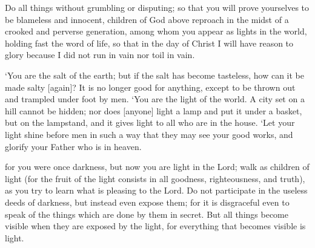 \begin{scripture}[Philippians 2:14-16]
    Do all things without grumbling or disputing;
    so that you will prove yourselves to be blameless and innocent, children of God above reproach in the midst of a crooked and perverse generation, among whom you appear as lights in the world,
    holding fast the word of life, so that in the day of Christ I will have reason to glory because I did not run in vain nor toil in vain.
\end{scripture}

\vspace{2\baselineskip}

\begin{scripture}[Matthew 5:13-16]
    `You are the salt of the earth; but if the salt has become tasteless, how can it be made salty [again]? It is no longer good for anything, except to be thrown out and trampled under foot by men.
    `You are the light of the world. A city set on a hill cannot be hidden;
    nor does [anyone] light a lamp and put it under a basket, but on the lampstand, and it gives light to all who are in the house.
    `Let your light shine before men in such a way that they may see your good works, and glorify your Father who is in heaven.
\end{scripture}

    \begin{scripture}[Ephesians 5:8-11]
        for you were once darkness, but now you are light in the Lord; walk as children of light
        (for the fruit of the light consists in all goodness, righteousness, and truth),
        as you try to learn what is pleasing to the Lord.
        Do not participate in the useless deeds of darkness, but instead even expose them;
        for it is disgraceful even to speak of the things which are done by them in secret.
        But all things become visible when they are exposed by the light, for everything that becomes visible is light.
    \end{scripture}

